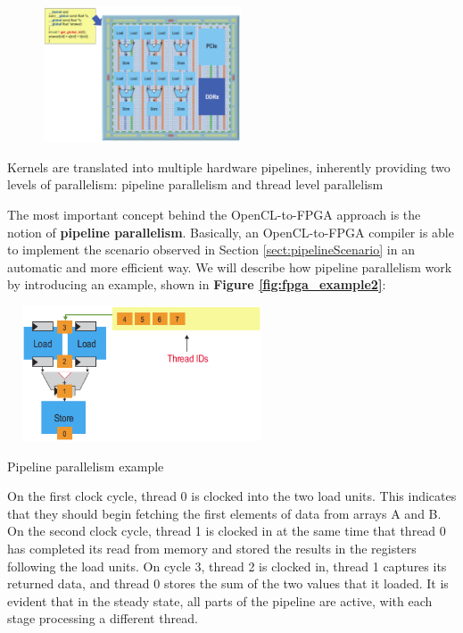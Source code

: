 \begin{figurehere}
 \centering
 \includegraphics[width=8cm, height=4cm]{./eps/FPGA1.eps}
 \caption{Kernels are translated into multiple hardware pipelines, inherently providing two levels of parallelism: pipeline parallelism and thread level parallelism}
 \label{fig:fpga_example}
\end{figurehere}

The most important concept behind the OpenCL-to-FPGA approach is the notion of \textbf{pipeline parallelism}.
Basically, an OpenCL-to-FPGA compiler is able to implement the scenario observed in Section \ref{sect:pipelineScenario} in an automatic and more efficient way. We will describe how pipeline parallelism work by introducing an example, shown in \textbf{Figure \ref{fig:fpga_example2}}:

\begin{figurehere}
 \centering
 \includegraphics[width=8cm, height=4cm]{./eps/FPGA2.eps}
 \caption{Pipeline parallelism example}
 \label{fig:fpga_example2}
\end{figurehere}

On the first clock cycle, thread 0 is clocked into the two load units. This indicates that they should begin fetching the first elements of data from arrays A and B. On the second clock cycle, thread 1 is clocked in
at the same time that thread 0 has completed its read from memory and stored the results in the registers following the load units. On cycle 3, thread 2 is clocked in, thread 1 captures its returned data, and thread 0 stores the sum of the two values that it loaded. It is evident that in the steady state, all parts of the pipeline are active, with each stage processing a different thread.
	
